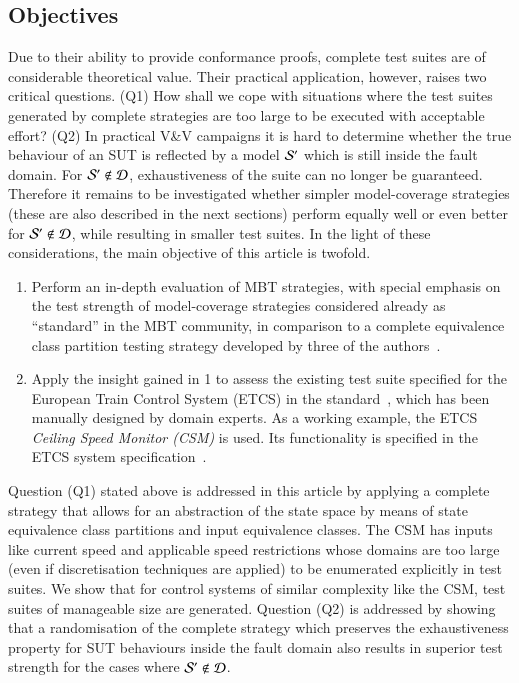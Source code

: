 \subsection{Objectives}
Due to their ability to provide conformance proofs, complete test suites are of 
 considerable theoretical value. Their practical application, however, raises two
 critical questions. (Q1) How shall we cope with situations where
  the test suites generated by complete 
 strategies are too large to be  executed with  acceptable effort? 
 (Q2) In practical V\&V campaigns it is hard to determine whether the true behaviour
 of an SUT is reflected by a model ${\cal S}'$ which is still inside the fault domain.
 For ${\cal S}' \not\in{\cal D}$, exhaustiveness of the suite can no longer be guaranteed.
Therefore it remains to be investigated whether simpler model-coverage strategies (these 
are also described in the next sections) perform equally well or even better 
for ${\cal S}' \not\in{\cal D}$, while resulting in smaller test suites.
In the light of these considerations, the main objective of this article is twofold.
\begin{enumerate}
\item Perform an in-depth evaluation of MBT strategies, with special emphasis
on the test strength of model-coverage strategies considered already as ``standard''
in the MBT community,
in comparison to a complete equivalence class partition testing  strategy developed by 
three of the authors~\cite{peleska_sttt_2014,huebner15}.

\item Apply the insight gained in 1 to assess the existing test suite specified for 
the European Train Control System (ETCS) in the standard~\cite{ETCS-Subset076}, which
has been manually designed by domain experts. As a working 
example, the ETCS \emph{Ceiling Speed Monitor (CSM)} is used. Its functionality is 
specified in the ETCS system specification~\cite{ETCSSRS-Principles}.
\end{enumerate}


Question (Q1) stated
 above is addressed in this article by applying a complete strategy that
allows for an abstraction of the state space by means of state equivalence class 
partitions and input equivalence classes. The CSM has inputs like current speed and
applicable speed restrictions whose domains are too large (even if discretisation techniques are applied) to be enumerated explicitly in test suites.
We show that for control systems of similar
complexity like the CSM, test suites of manageable size are generated. 
Question (Q2) 
is addressed by showing that a randomisation of the complete strategy which
preserves the exhaustiveness property for SUT behaviours inside the fault domain
also results in superior  test strength for the cases where ${\cal S}' \not\in{\cal D}$.




